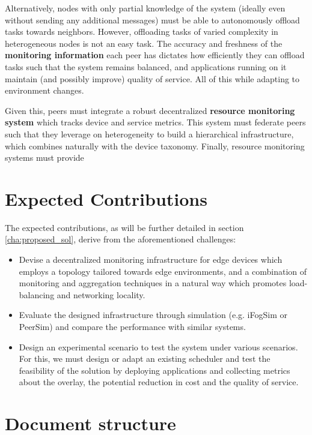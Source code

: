 Alternatively, nodes with only partial knowledge of the system (ideally even without sending any additional messages) must be able to autonomously offload tasks towards neighbors. However, offloading tasks of varied complexity in heterogeneous nodes is not an easy task. The accuracy and freshness of the \textbf{monitoring information} each peer has dictates how efficiently they can offload tasks such that the system remains balanced, and applications running on it maintain (and possibly improve) quality of service. All of this while adapting to environment changes. 

Given this, peers must integrate a robust decentralized \textbf{resource monitoring system} which tracks device and service metrics. This system must federate peers such that they leverage on heterogeneity to build a hierarchical infrastructure, which combines naturally with the device taxonomy. Finally, resource monitoring systems must provide 

\section{Expected Contributions}

The expected contributions, as will be further detailed in section \ref{cha:proposed_sol}, derive from the aforementioned challenges:

\begin{itemize}

    \item Devise a decentralized monitoring infrastructure for edge devices which employs a topology tailored towards edge environments, and a combination of monitoring and aggregation techniques in a natural way which promotes load-balancing and networking locality.
    
    \item Evaluate the designed infrastructure through simulation (e.g. iFogSim or PeerSim) and compare the performance with similar systems.

    \item Design an experimental scenario to test the system under various scenarios. For this, we must design or adapt an existing scheduler and test the feasibility of the solution by deploying applications and collecting metrics about the overlay, the potential reduction in cost and the quality of service.
    
\end{itemize}

\section{Document structure}

